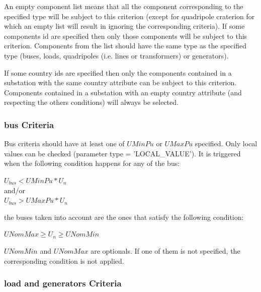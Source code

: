 \documentclass[a4paper, 12pt]{report}
\begin{document}
An empty component list means that all the component corresponding to the specified type will be subject to this
criterion (except for quadripole craterion for which an empty list will result in ignoring the corresponding criteria).
If some components id are specified then only those components will
be subject to this criterion. Components from the list should have the same type as the
specified type (buses, loads, quadripoles (i.e. lines or transformers) or generators).

If some country ids are specified then only the components contained in a
substation with the same country attribute can be subject to this
criterion. Components contained in a substation with an empty country attribute
(and respecting the others conditions) will always be selected.

\subsubsection{bus Criteria}

Bus criteria should have at least one of $UMinPu$ or $UMaxPu$ specified. Only
local values can be checked (parameter type = 'LOCAL\_VALUE').
It is triggered when the following condition happens for any of the bus: \\
\begin{center}
$U_{bus} < UMinPu*U_n$\\
and/or\\
$U_{bus} > UMaxPu*U_n$ \\
\end{center}
the buses taken into account are the ones that satisfy the
following condition:
\begin{center}
$UNomMax \ge U_n \ge UNomMin$\\
\end{center}

$UNomMin$ and $UNomMax$ are optionals. If one of them is not
specified, the corresponding condition is not applied.

\subsubsection{load and generators Criteria}
\end{document}
